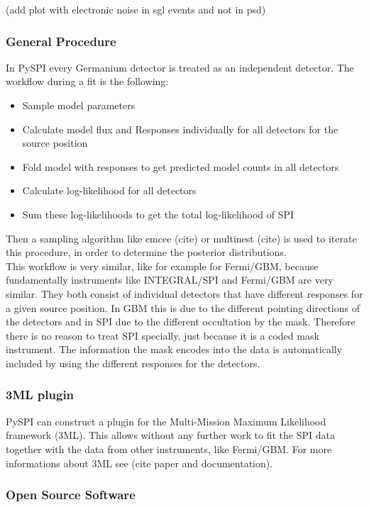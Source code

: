\documentclass[modern]{aastex631}
\begin{document}
(add plot with electronic noise in sgl events and not in psd)

\subsubsection*{General Procedure}

In PySPI every Germanium detector is treated as an independent detector. The workflow during a fit is the following:
\begin{itemize}
  \item Sample model parameters
  \item Calculate model flux and Responses individually for all detectors for the source position
  \item Fold model with responses to get predicted model counts in all detectors
  \item Calculate log-likelihood for all detectors
  \item Sum these log-likelihoods to get the total log-likelihood of SPI
\end{itemize}
Then a sampling algorithm like emcee (cite) or multinest (cite) is used to iterate this procedure, in order to determine the posterior distributions.\\
This workflow is very similar, like for example for Fermi/GBM, because fundamentally instruments like INTEGRAL/SPI and Fermi/GBM are very similar. They both consist of individual detectors that have different responses for a given source position. In GBM this is due to the different pointing directions of the detectors and in SPI due to the different occultation by the mask. Therefore there is no reason to treat SPI specially, just because it is a coded mask instrument. The information the mask encodes into the data is automatically included by using the different responses for the detectors.

\subsubsection*{3ML plugin}

PySPI can construct a plugin for the Multi-Mission Maximum Likelihood framework (3ML). This allows without any further work to fit the SPI data together with the data from other instruments, like Fermi/GBM. For more informations about 3ML see (cite paper and documentation).

\subsubsection*{Open Source Software}
\end{document}
